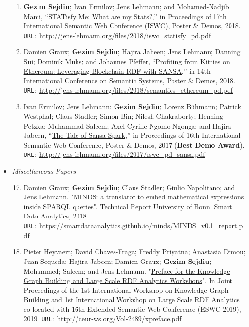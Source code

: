 \begin{itemize}
\begin{enumerate}
    \item \textbf{Gezim Sejdiu}; Ivan Ermilov; Jens Lehmann; and Mohamed-Nadjib Mami, “\href{http://jens-lehmann.org/files/2018/iswc_statisfy_pd.pdf}{STATisfy Me: What are my Stats?},” in Proceedings of 17th International Semantic Web Conference (ISWC), Poster \& Demos, 2018. \texttt{URL}:~\url{http://jens-lehmann.org/files/2018/iswc_statisfy_pd.pdf}
    
    \item Damien Graux; \textbf{Gezim Sejdiu}; Hajira Jabeen; Jens Lehmann; Danning Sui; Dominik Muhs; and Johannes Pfeffer, “\href{http://jens-lehmann.org/files/2018/semantics_ethereum_pd.pdf}{Profiting from Kitties on Ethereum: Leveraging Blockchain RDF with SANSA},” in 14th International Conference on Semantic Systems, Poster \& Demos, 2018. \texttt{URL}:~\url{http://jens-lehmann.org/files/2018/semantics_ethereum_pd.pdf}
    
    \item Ivan Ermilov; Jens Lehmann; \textbf{Gezim Sejdiu}; Lorenz Bühmann; Patrick Westphal; Claus Stadler; Simon Bin; Nilesh Chakraborty; Henning Petzka; Muhammad Saleem; Axel-Cyrille Ngomo Ngonga; and Hajira Jabeen, “\href{http://jens-lehmann.org/files/2017/iswc_pd_sansa.pdf}{The Tale of Sansa Spark},” in Proceedings of 16th International Semantic Web Conference, Poster \& Demos, 2017 ({\color{darkred}\textbf{Best Demo Award}}). \texttt{URL}:~\url{http://jens-lehmann.org/files/2017/iswc_pd_sansa.pdf}
        
    \end{enumerate}
    
\item \emph{Miscellaneous Papers}

    \begin{enumerate}
    \setcounter{enumi}{16}
    
    \item Damien Graux; \textbf{Gezim Sejdiu}; Claus Stadler; Giulio Napolitano; and Jens Lehmann. "\href{https://smartdataanalytics.github.io/minds/MINDS_v0.1_report.pdf}{MINDS: a translator to embed mathematical expressions inside SPARQL queries}". Technical Report University of Bonn, Smart Data Analytics, 2018. 
    \texttt{URL}:~\url{https://smartdataanalytics.github.io/minds/MINDS_v0.1_report.pdf}
    
    \item Pieter Heyvaert; David Chaves-Fraga; Freddy Priyatna; Anastasia Dimou; Juan Sequeda; Hajira Jabeen; Damien Graux; \textbf{Gezim Sejdiu}; Mohammed; Saleem; and Jens Lehmann. "\href{http://ceur-ws.org/Vol-2489/xpreface.pdf}{Preface for the Knowledge Graph Building and Large Scale RDF Analytics Workshops}". In Joint Proceedings of the 1st International Workshop on Knowledge Graph Building and 1st International Workshop on Large Scale RDF Analytics co-located with 16th Extended Semantic Web Conference (ESWC 2019), 2019.
    \texttt{URL}:~\url{http://ceur-ws.org/Vol-2489/xpreface.pdf}
    

\end{enumerate}
\end{itemize}
